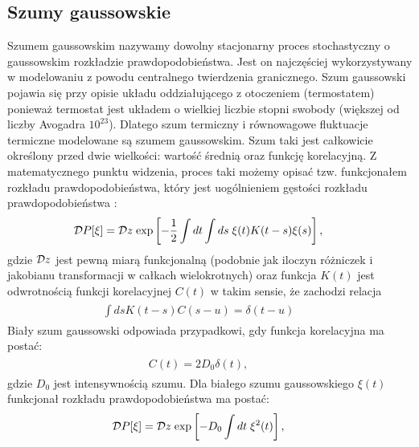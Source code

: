 \documentclass[a4paper,12pt,polish]{sphinxmanual}
\begin{document}
\subsection{Szumy gaussowskie}
\label{ch3/chIII031:szumy-gaussowskie}
Szumem gaussowskim nazywamy dowolny stacjonarny proces stochastyczny o gaussowskim rozkładzie prawdopodobieństwa. Jest on najczęściej wykorzystywany w modelowaniu z powodu centralnego twierdzenia granicznego. Szum gaussowski pojawia się przy opisie układu oddziałującego z otoczeniem (termostatem) ponieważ termostat jest układem o wielkiej liczbie stopni swobody (większej od liczby Avogadra $10^{23}$). Dlatego szum termiczny i równowagowe fluktuacje termiczne modelowane są szumem gaussowskim. Szum taki jest całkowicie określony przed dwie wielkości: wartość średnią oraz funkcję korelacyjną. Z matematycznego punktu widzenia, proces taki możemy opisać tzw. funkcjonałem rozkładu prawdopodobieństwa, który jest uogólnieniem gęstości rozkładu prawdopodobieństwa :
\label{ch3/chIII031:equation-eqn5}\begin{gather}
\begin{split}{\cal D}P[\xi] = {\cal D}z \; {\mbox{exp}}\left[-\frac{1}{2} \int dt\int ds\;\xi(t) K(t-s) \xi(s) \right], \qquad\end{split}\label{ch3/chIII031-eqn5}
\end{gather}
gdzie ${\cal D} z$ jest pewną miarą funkcjonalną (podobnie jak iloczyn różniczek i jakobianu transformacji w całkach wielokrotnych) oraz funkcja $K(t)$ jest odwrotnością funkcji korelacyjnej $C(t)$ w takim sensie, że zachodzi relacja
\label{ch3/chIII031:equation-eqn6}\begin{gather}
\begin{split}\int ds K(t-s) C(s-u) = \delta (t-u) \qquad\end{split}\label{ch3/chIII031-eqn6}
\end{gather}
Biały szum gaussowski odpowiada przypadkowi, gdy funkcja korelacyjna ma postać:
\label{ch3/chIII031:equation-eqn7}\begin{gather}
\begin{split}C(t)= 2D_0 \delta (t), \qquad\end{split}\label{ch3/chIII031-eqn7}
\end{gather}
gdzie $D_0$ jest intensywnością szumu. Dla białego szumu gaussowskiego $\xi(t)$ funkcjonał rozkładu prawdopodobieństwa ma postać:
\label{ch3/chIII031:equation-eqn8}\begin{gather}
\begin{split}{\cal D}P[\xi] = {\cal D}z \; {\mbox{exp}}\left[-D_0 \int dt\;\xi^2(t) \right], \qquad\end{split}\label{ch3/chIII031-eqn8}
\end{gather}
\end{document}
